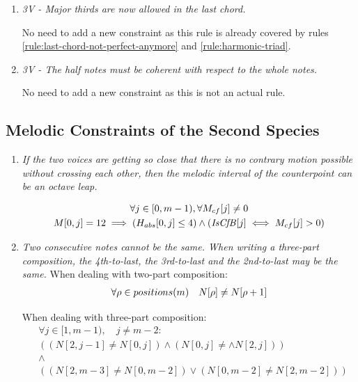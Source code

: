 \begin{enumerate}[wide, label=\bfseries 2.H\arabic*]
\item \textit{3V - Major thirds are now allowed in the last chord.}

No need to add a new constraint as this rule is already covered by rules \ref{rule:last-chord-not-perfect-anymore} and \ref{rule:harmonic-triad}.

\item \textit{3V - The half notes must be coherent with respect to the whole notes.}

No need to add a new constraint as this is not an actual rule.

\end{enumerate}

\subsection*{Melodic Constraints of the Second Species}
\begin{enumerate}[wide, label=\bfseries 2.M\arabic*]

\item\label{rule:octaveleap}{ \textit{If the two voices are getting so close that there is no contrary motion possible without crossing each other, then the melodic interval of the counterpoint can be an octave leap.}}

\begin{equation}
    \begin{gathered}
        \forall j \in [0, m-1), \forall M_{cf}[j] \neq 0\\
        M[0, j] = 12 \implies (H_{abs}[0, j] \leq 4) \land (\mathit{IsCfB}[j] \iff M_{cf}[j]>0)
    \end{gathered}
\end{equation}

\item\label{rule:notsamecons}{ \textit{Two consecutive notes cannot be the same. When writing a three-part composition, the 4th-to-last, the 3rd-to-last and the 2nd-to-last may be the same.}}
When dealing with two-part composition:
\begin{equation}
    \begin{gathered}
        \forall \rho \in positions(m) \quad
        N[\rho] \neq N[\rho+1]
    \end{gathered}
\end{equation}

When dealing with three-part composition:
\begin{equation}
  \begin{aligned}
      &\forall j \in [1, m-1), \quad j \neq m-2:\\
      &((N[2, j-1] \neq N[0, j]) \land (N[0, j] \neq \land N[2, j])) \\
      &\land \\
      & ((N[2, m-3] \neq N[0, m-2]) \lor (N[0, m-2] \neq N[2, m-2]) )
  \end{aligned}
\end{equation}


\end{enumerate}
